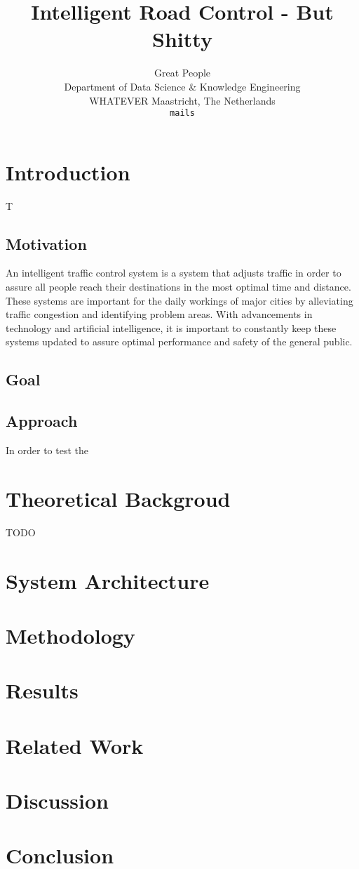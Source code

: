 \documentclass[10pt]{article}
\title{Intelligent Road Control - But Shitty}
\author{Great People \\
	Department of Data Science \& Knowledge Engineering\\
	WHATEVER Maastricht, The Netherlands\\
	{\tt mails}
  }
\begin{document}
\maketitle

\begin{abstract}
	
\end{abstract}

\section{Introduction}
T

\subsection{Motivation}
An intelligent traffic control system is a system that adjusts traffic in order to assure all people reach their destinations in the most optimal time and distance.  These systems are important for the daily workings of major cities by alleviating traffic congestion and identifying problem areas.  With advancements in technology and artificial intelligence, it is important to constantly keep these systems updated to assure optimal performance and safety of the general public.

\subsection{Goal}

\subsection{Approach}
In order to test the 

\section{Theoretical Backgroud}
TODO
	
\section{System Architecture}
\lipsum[2-3]
	
\section{Methodology}
\lipsum[2-3]

\section{Results}
\lipsum[2-3]

\section{Related Work}
\lipsum[2-3]

\section{Discussion}
\lipsum[2-3]
	
\section{Conclusion}
\lipsum[2-3]

{\tiny\printbibliography}
\end{document}
